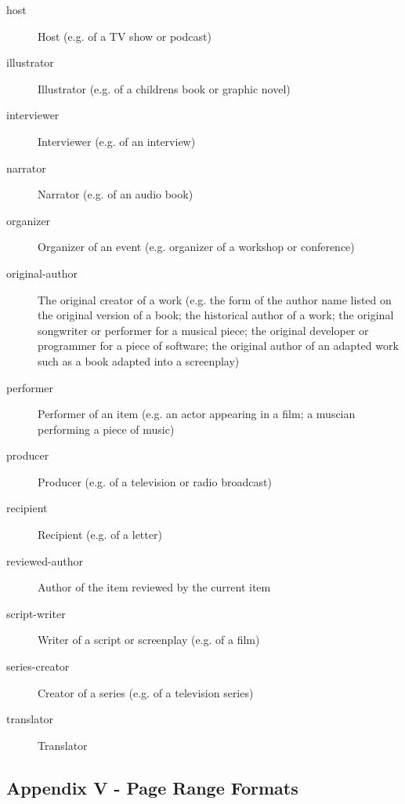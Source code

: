 \begin{description}
  \item[host]
    Host (e.g. of a TV show or podcast)

  \item[illustrator]
    Illustrator (e.g. of a children\textquotesingle s book or graphic novel)

  \item[interviewer]
    Interviewer (e.g. of an interview)

  \item[narrator]
    Narrator (e.g. of an audio book)

  \item[organizer]
    Organizer of an event (e.g. organizer of a workshop or conference)

  \item[original-author]
    The original creator of a work (e.g. the form of the author name listed
    on the original version of a book; the historical author of a work; the
    original songwriter or performer for a musical piece; the original
    developer or programmer for a piece of software; the original author of
    an adapted work such as a book adapted into a screenplay)

  \item[performer]
    Performer of an item (e.g. an actor appearing in a film; a muscian
    performing a piece of music)

  \item[producer]
    Producer (e.g. of a television or radio broadcast)

  \item[recipient]
    Recipient (e.g. of a letter)

  \item[reviewed-author]
    Author of the item reviewed by the current item

  \item[script-writer]
    Writer of a script or screenplay (e.g. of a film)

  \item[series-creator]
    Creator of a series (e.g. of a television series)

  \item[translator]
    Translator
    \end{description}

\hypertarget{appendix-v---page-range-formats}{%
\subsection{Appendix V - Page Range
Formats}\label{appendix-v---page-range-formats}}

